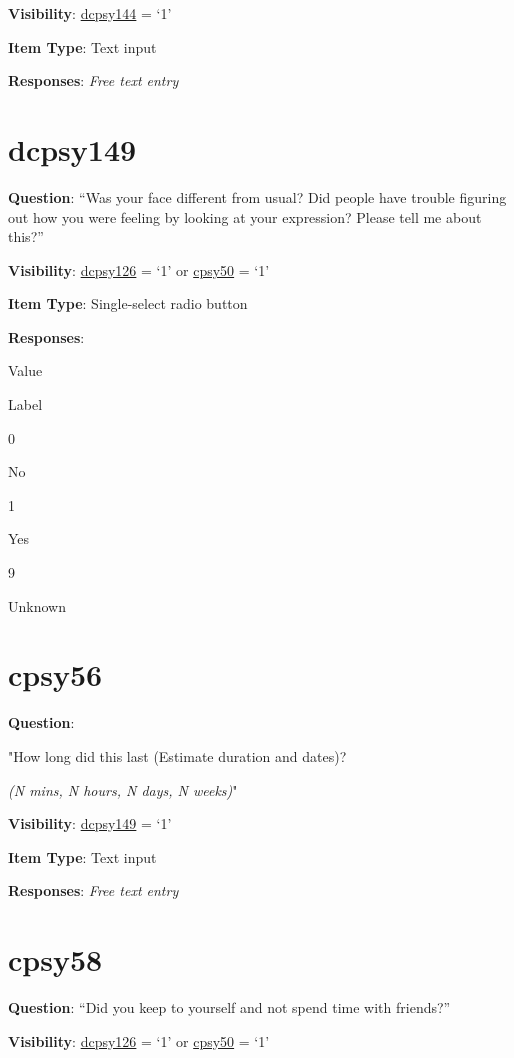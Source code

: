 \documentclass[]{book}
\begin{document}
\textbf{Visibility}: \protect\hyperlink{dcpsy144}{dcpsy144} = `1'

\textbf{Item Type}: Text input

\textbf{Responses}: \emph{Free text entry}

\hypertarget{dcpsy149}{%
\section{dcpsy149}\label{dcpsy149}}

\textbf{Question}: ``Was your face different from usual? Did people have trouble figuring out how you were feeling by looking at your expression? Please tell me about this?''

\textbf{Visibility}: \protect\hyperlink{dcpsy126}{dcpsy126} = `1' or \protect\hyperlink{cpsy50}{cpsy50} = `1'

\textbf{Item Type}: Single-select radio button

\textbf{Responses}:

Value

Label

0

No

1

Yes

9

Unknown

\hypertarget{cpsy56}{%
\section{cpsy56}\label{cpsy56}}

\textbf{Question}:

"How long did this last (Estimate duration and dates)?

\emph{(N mins, N hours, N days, N weeks)}"

\textbf{Visibility}: \protect\hyperlink{dcpsy149}{dcpsy149} = `1'

\textbf{Item Type}: Text input

\textbf{Responses}: \emph{Free text entry}

\hypertarget{cpsy58}{%
\section{cpsy58}\label{cpsy58}}

\textbf{Question}: ``Did you keep to yourself and not spend time with friends?''

\textbf{Visibility}: \protect\hyperlink{dcpsy126}{dcpsy126} = `1' or \protect\hyperlink{cpsy50}{cpsy50} = `1'
\end{document}
